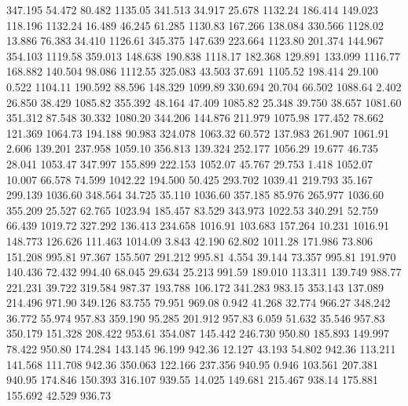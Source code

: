 347.195   54.472   80.482      1135.05
 341.513   34.917   25.678      1132.24
 186.414  149.023  118.196      1132.24
  16.489   46.245   61.285      1130.83
 167.266  138.084  330.566      1128.02
  13.886   76.383   34.410      1126.61
 345.375  147.639  223.664      1123.80
 201.374  144.967  354.103      1119.58
 359.013  148.638  190.838      1118.17
 182.368  129.891  133.099      1116.77
 168.882  140.504   98.086      1112.55
 325.083   43.503   37.691      1105.52
 198.414   29.100    0.522      1104.11
 190.592   88.596  148.329      1099.89
 330.694   20.704   66.502      1088.64
   2.402   26.850   38.429      1085.82
 355.392   48.164   47.409      1085.82
  25.348   39.750   38.657      1081.60
 351.312   87.548   30.332      1080.20
 344.206  144.876  211.979      1075.98
 177.452   78.662  121.369      1064.73
 194.188   90.983  324.078      1063.32
  60.572  137.983  261.907      1061.91
   2.606  139.201  237.958      1059.10
 356.813  139.324  252.177      1056.29
  19.677   46.735   28.041      1053.47
 347.997  155.899  222.153      1052.07
  45.767   29.753    1.418      1052.07
  10.007   66.578   74.599      1042.22
 194.500   50.425  293.702      1039.41
 219.793   35.167  299.139      1036.60
 348.564   34.725   35.110      1036.60
 357.185   85.976  265.977      1036.60
 355.209   25.527   62.765      1023.94
 185.457   83.529  343.973      1022.53
 340.291   52.759   66.439      1019.72
 327.292  136.413  234.658      1016.91
 103.683  157.264   10.231      1016.91
 148.773  126.626  111.463      1014.09
   3.843   42.190   62.802      1011.28
 171.986   73.806  151.208       995.81
  97.367  155.507  291.212       995.81
   4.554   39.144   73.357       995.81
 191.970  140.436   72.432       994.40
  68.045   29.634   25.213       991.59
 189.010  113.311  139.749       988.77
 221.231   39.722  319.584       987.37
 193.788  106.172  341.283       983.15
 353.143  137.089  214.496       971.90
 349.126   83.755   79.951       969.08
   0.942   41.268   32.774       966.27
 348.242   36.772   55.974       957.83
 359.190   95.285  201.912       957.83
   6.059   51.632   35.546       957.83
 350.179  151.328  208.422       953.61
 354.087  145.442  246.730       950.80
 185.893  149.997   78.422       950.80
 174.284  143.145   96.199       942.36
  12.127   43.193   54.802       942.36
 113.211  141.568  111.708       942.36
 350.063  122.166  237.356       940.95
   0.946  103.561  207.381       940.95
 174.846  150.393  316.107       939.55
  14.025  149.681  215.467       938.14
 175.881  155.692   42.529       936.73
